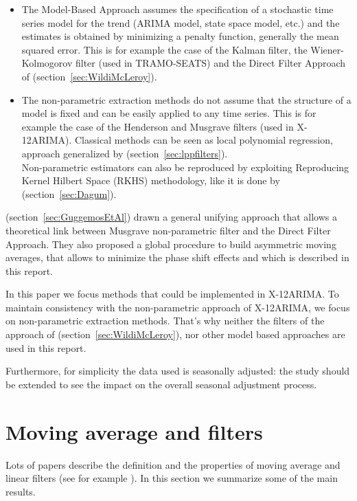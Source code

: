 \documentclass[
  12pt,
  ,
  a4paper]{article}
\newcommand\1{\mathds{1}}
\begin{document}
\begin{itemize}
\item
  The Model-Based Approach assumes the specification of a stochastic time series model for the trend (ARIMA model, state space model, etc.) and the estimates is obtained by minimizing a penalty function, generally the mean squared error.
  This is for example the case of the Kalman filter, the Wiener-Kolmogorov filter (used in TRAMO-SEATS) and the Direct Filter Approach of \textcite{trilemmaWMR2019} (section~\ref{sec:WildiMcLeroy}).
\item
  The non-parametric extraction methods do not assume that the structure of a model is fixed and can be easily applied to any time series.
  This is for example the case of the Henderson and Musgrave filters (used in X-12ARIMA).
  Classical methods can be seen as local polynomial regression, approach generalized by \textcite{proietti2008} (section~\ref{sec:lppfilters}).\\
  Non-parametric estimators can also be reproduced by exploiting Reproducing Kernel Hilbert Space (RKHS) methodology, like it is done by
  \textcite{dagumbianconcini2008} (section~\ref{sec:Dagum}).
\end{itemize}

\textcite{ch15HBSA} (section~\ref{sec:GuggemosEtAl}) drawn a general unifying approach that allows a theoretical link between Musgrave non-parametric filter and the Direct Filter Approach.
They also proposed a global procedure to build asymmetric moving averages, that allows to minimize the phase shift effects and which is described in this report.

In this paper we focus methods that could be implemented in X-12ARIMA.
To maintain consistency with the non-parametric approach of X-12ARIMA, we focus on non-parametric extraction methods.
That's why neither the filters of the approach of \textcite{trilemmaWMR2019} (section~\ref{sec:WildiMcLeroy}), nor other model based approaches are used in this report.

Furthermore, for simplicity the data used is seasonally adjusted: the study should be extended to see the impact on the overall seasonal adjustment process.

\hypertarget{sec:propMM}{%
\section{Moving average and filters}\label{sec:propMM}}

Lots of papers describe the definition and the properties of moving average and linear filters (see for example \textcite{ch12HBSA}).
In this section we summarize some of the main results.
\end{document}
